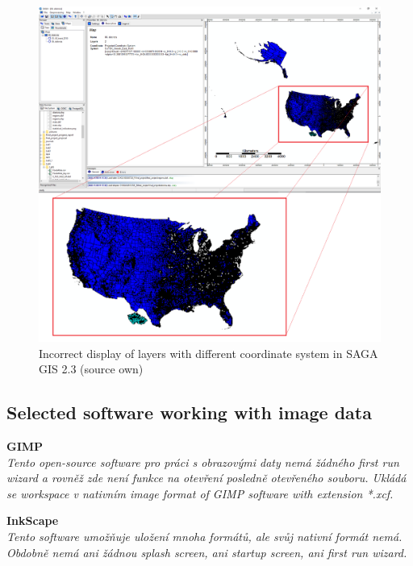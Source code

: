 \documentclass[a4paper,10pt,twoside]{article}
\begin{document}
\vspace{0.3cm}
\begin{figure}[hbt!] 
\begin{center}
\includegraphics[width=15cm]{../pictures/saga_gis_cele.png} 
\caption[Incorrect display of layers with different coordinate system in SAGA GIS 2.3 (source own)]{Incorrect display of layers with different coordinate system in SAGA GIS 2.3 (source own)}
\label{fig:saga_gis_cele}
\end{center}
\end{figure}


\subsection{Selected software working with image data}

\noindent \textbf{GIMP} \\

\noindent \textit{\color{red}Tento open-source software pro práci s obrazovými daty nemá žádného first run wizard a rovněž zde není funkce na otevření posledně otevřeného souboru. Ukládá se workspace v nativním image format of GIMP software with extension *.xcf.}

\noindent \textbf{InkScape} \\

\noindent \textit{\color{red}Tento software umožňuje uložení mnoha formátů, ale svůj nativní formát nemá. Obdobně nemá ani žádnou splash screen, ani startup screen, ani first run wizard.}
\end{document}
